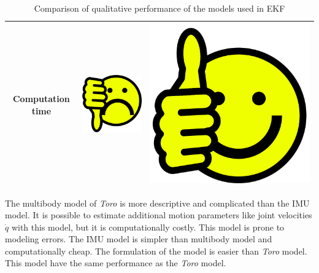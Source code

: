 \begin{table}
\begin{tabular}{|c|c|c|}
	Computation time &\includegraphics{Bilder/thumbs-down.png} &\includegraphics[scale=0.025]{Bilder/thumbs-up.png} \\ \hline
	\end{tabular}
	\caption{Comparison of qualitative performance of the models used in EKF }
\end{table}

The multibody model of \emph{Toro} is more descriptive and complicated than the IMU model. It is possible to estimate additional motion parameters like joint velocities $\dot q$ with this model, but it is computationally costly. This model is prone to modeling errors. The IMU model is simpler than multibody model and computationally cheap. The formulation of the model is easier than \emph{Toro} model. This model have the same performance as the \emph{Toro} model.

